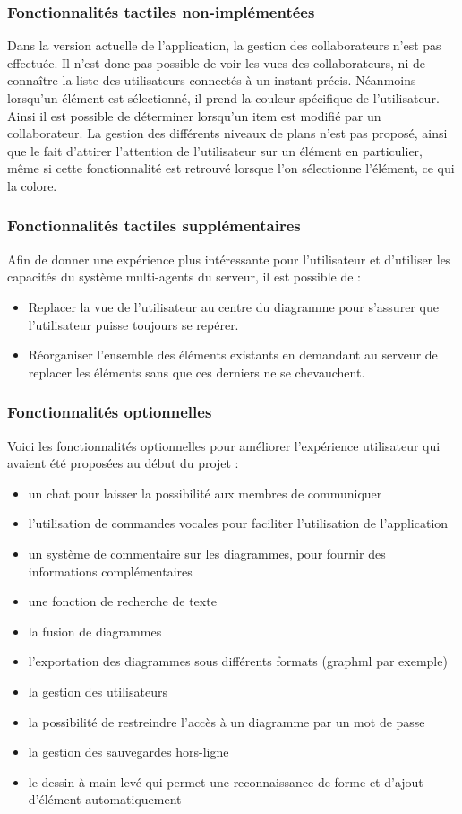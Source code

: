 \subsubsection{Fonctionnalités tactiles non-implémentées}
Dans la version actuelle de l'application, la gestion des collaborateurs n'est pas effectuée.
Il n'est donc pas possible de voir les vues des collaborateurs, ni de connaître la liste des utilisateurs connectés à un instant précis.
Néanmoins lorsqu'un élément est sélectionné, il prend la couleur spécifique de l'utilisateur.
Ainsi il est possible de déterminer lorsqu'un item est modifié par un collaborateur. 
La gestion des différents niveaux de plans n'est pas proposé, ainsi que le fait d'attirer l'attention de l'utilisateur sur un élément en particulier, même si cette fonctionnalité est retrouvé lorsque l'on sélectionne l'élément, ce qui la colore. 

\subsubsection{Fonctionnalités tactiles supplémentaires}
Afin de donner une expérience plus intéressante pour l'utilisateur et d'utiliser les capacités du système multi-agents du serveur, il est possible de :
\begin{itemize}
	\item Replacer la vue de l'utilisateur au centre du diagramme pour s'assurer que l'utilisateur puisse toujours se repérer.
	\item Réorganiser l'ensemble des éléments existants en demandant au serveur de replacer les éléments sans que ces derniers ne se chevauchent.
\end{itemize}

\subsubsection{Fonctionnalités optionnelles}
Voici les fonctionnalités optionnelles pour améliorer l'expérience utilisateur qui avaient été proposées au début du projet :
\begin{itemize}
\item un chat pour laisser la possibilité aux membres de communiquer
\item l'utilisation de commandes vocales pour faciliter l'utilisation de l'application
\item un système de commentaire sur les diagrammes, pour fournir des informations complémentaires
\item une fonction de recherche de texte
\item la fusion de diagrammes
\item l'exportation des diagrammes sous différents formats (graphml par exemple)
\item la gestion des utilisateurs
\item la possibilité de restreindre l'accès à un diagramme par un mot de passe
\item la gestion des sauvegardes hors-ligne
\item le dessin à main levé qui permet une reconnaissance de forme et d'ajout d'élément automatiquement
\end{itemize}

